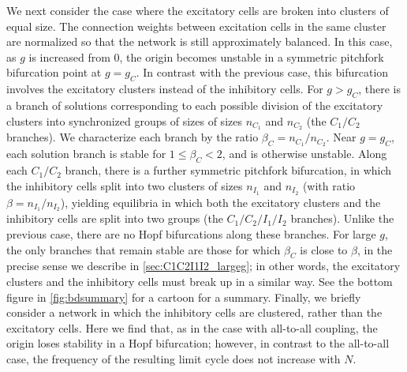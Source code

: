 \documentclass[reqno]{siamonline190516}
\begin{document}
We next consider the case where the excitatory cells are broken into clusters of equal size. The connection weights between excitation cells in the same cluster are normalized so that the network is still approximately balanced. In this case, as $g$ is increased from 0, the origin becomes unstable in a symmetric pitchfork bifurcation point at $g=g_C$. In contrast with the previous case, this bifurcation involves the excitatory clusters instead of the inhibitory cells. For $g>g_C$, there is a branch of solutions corresponding to each possible division of the excitatory clusters into synchronized groups of sizes of sizes $n_{C_1}$ and $n_{C_2}$ (the $C_1/C_2$ branches). We characterize each branch by the ratio $\beta_C = n_{C_1}/n_{C_2}$. Near $g = g_C$, each solution branch is stable for $1 \le \beta_C < 2$, and is otherwise unstable. Along each $C_1/C_2$ branch, there is a further symmetric pitchfork bifurcation, in which the inhibitory cells split into two clusters of sizes $n_{I_1}$ and $n_{I_2}$ (with ratio $\beta = n_{I_1}/n_{I_2}$), yielding equilibria in which both the excitatory clusters and the inhibitory cells are split into two groups (the $C_1/C_2/I_1/I_2$ branches). Unlike the previous case, there are no Hopf bifurcations along these branches. For large $g$, the only branches that remain stable are those for which $\beta_C$ is close to $\beta$, in the precise sense we describe in \cref{sec:C1C2I1I2_largeg}; in other words, the excitatory clusters and the inhibitory cells must break up in a similar way. See the bottom figure in \cref{fig:bdsummary} for a cartoon for a summary. Finally, we briefly consider a network in which the inhibitory cells are clustered, rather than the excitatory cells. Here we find that, as in the case with all-to-all coupling, the origin loses stability in a Hopf bifurcation; however, in contrast to the all-to-all case, the frequency of the resulting limit cycle does not increase with $N$.
\end{document}
